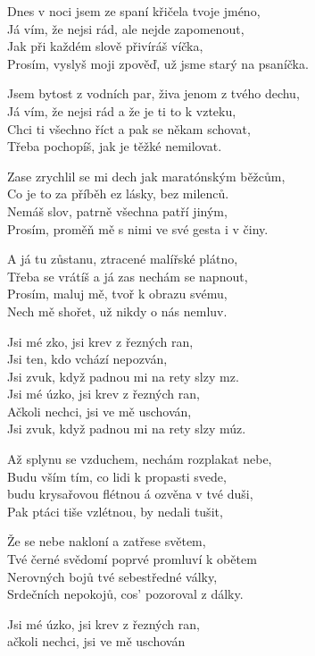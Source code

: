 


\thispagestyle{empty}

\vspace{-5px}
\ve
{}Dnes v noci jsem ze spaní křičela tvoje jméno,\\
Já vím, že nejsi rád, ale nejde zapomenout,\\
Jak při každém slově přivíráš víčka,\\
Prosím, vyslyš moji zpověď, už jsme starý na psaníčka.

\vspace{-5px}
\ve
Jsem bytost z vodních par, živa jenom z tvého dechu,\\
Já vím, že nejsi rád a že je ti to k vzteku,\\
Chci ti všechno říct a pak se někam schovat,\\
Třeba pochopíš, jak je těžké nemilovat.

\vspace{-5px}
\ve
Zase zrychlil se mi dech jak maratónským běžcům,\\
Co je to za příběh ez lásky, bez milenců.\\
Nemáš slov, patrně všechna patří jiným,\\
Prosím, proměň mě s nimi ve své gesta i v činy.

\vspace{-5px}
\ve
A já tu zůstanu, ztracené malířské plátno,\\
Třeba se vrátíš a já zas nechám se napnout,\\
Prosím, maluj mě, tvoř k obrazu svému,\\
Nech mě shořet, už nikdy o nás nemluv.

\vspace{-5px}
\cho{}
Jsi mé zko, jsi krev z řezných ran,\\
Jsi ten, kdo vchází nepozván,\\
Jsi zvuk, když padnou mi na rety slzy mz.\\
Jsi mé úzko, jsi krev z řezných ran,\\
Ačkoli nechci, jsi ve mě uschován,\\
Jsi zvuk, když padnou mi na rety slzy múz.

\vspace{-5px}
\ve
Až splynu se vzduchem, nechám rozplakat nebe,\\
Budu vším tím, co lidi k propasti svede, \\
budu krysařovou flétnou á ozvěna v tvé duši,\\
Pak ptáci tiše vzlétnou, by nedali tušit,

\vspace{-5px}
\ve
Že se nebe nakloní a zatřese světem,\\
Tvé černé svědomí poprvé promluví k obětem\\
Nerovných bojů tvé sebestředné války,\\
Srdečních nepokojů, cos' pozoroval z dálky.

\vspace{-5px}
\cho{}
Jsi mé úzko, jsi krev z řezných ran,\\
ačkoli nechci, jsi ve mě uschován


\esong